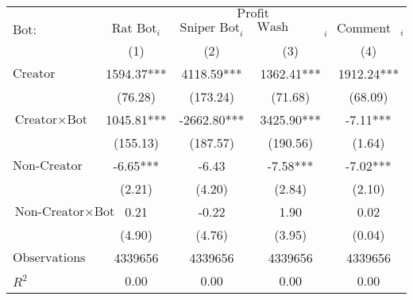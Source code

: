 \begin{tabular}{lcccc}
\hline
 & \multicolumn{4}{c}{$\text{Profit}$} \\
 $\text{Bot}:$ & $\text{Rat Bot}_{i}$ & $\text{Sniper Bot}_{i}$ & $\text{Wash Trading Bot}_{i}$ & $\text{Comment Bot}_{i}$ \\
 & (1) & (2) & (3) & (4)\\
\hline
$\text{Creator}$ & 1594.37*** & 4118.59*** & 1362.41*** & 1912.24*** \\
 & (76.28) & (173.24) & (71.68) & (68.09) \\
$\text{Creator} \times \text{Bot}$ & 1045.81*** & -2662.80*** & 3425.90*** & -7.11*** \\
 & (155.13) & (187.57) & (190.56) & (1.64) \\
$\text{Non-Creator}$ & -6.65*** & -6.43 & -7.58*** & -7.02*** \\
 & (2.21) & (4.20) & (2.84) & (2.10) \\
$\text{Non-Creator} \times \text{Bot}$ & 0.21 & -0.22 & 1.90 & 0.02 \\
 & (4.90) & (4.76) & (3.95) & (0.04) \\
$\text{Observations}$ & 4339656 & 4339656 & 4339656 & 4339656 \\
$R^2$ & 0.00 & 0.00 & 0.00 & 0.00 \\
\hline
\end{tabular}